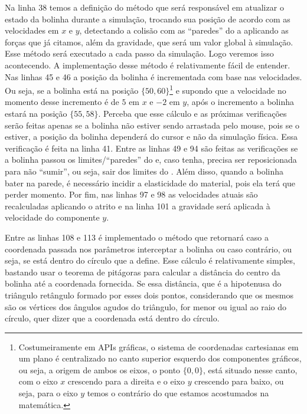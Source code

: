 Na linha 38 temos a definição do método  que será responsável em atualizar o estado da bolinha durante a simulação, trocando sua posição de acordo com as velocidades em $x$ e $y$, detectando a colisão com as ``paredes'' do  a aplicando as forças que já citamos, além da gravidade, que será um valor global à simulação. Esse método será executado a cada passo da simulação. Logo veremos isso acontecendo. A implementação desse método é relativamente fácil de entender. Nas linhas 45 e 46 a posição da bolinha é incrementada com base nas velocidades. Ou seja, se a bolinha está na posição $\{50, 60\}$\footnote{Costumeiramente em APIs gráficas, o sistema de coordenadas cartesianas em um plano é centralizado no canto superior esquerdo dos componentes gráficos, ou seja, a origem de ambos os eixos, o ponto $\{0, 0\}$, está situado nesse canto, com o eixo $x$ crescendo para a direita e o eixo $y$ crescendo para baixo, ou seja, para o eixo $y$ temos o contrário do que estamos acostumados na matemática.} e supondo que a velocidade no momento desse incremento é de $5$ em $x$ e $-2$ em $y$, após o incremento a bolinha estará na posição $\{55, 58\}$. Perceba que esse cálculo e as próximas verificações serão feitas apenas se a bolinha não estiver sendo arrastada pelo mouse, pois se o estiver, a posição da bolinha dependerá do cursor e não da simulação física. Essa verificação é feita na linha 41. Entre as linhas 49 e 94 são feitas as verificações se a bolinha passou os limites/``paredes'' do  e, caso tenha, precisa ser reposicionada para não ``sumir'', ou seja, sair dos limites do . Além disso, quando a bolinha bater na parede, é necessário incidir a elasticidade do material, pois ela terá que perder momento. Por fim, nas linhas 97 e 98 as velocidades atuais são recalculadas aplicando o atrito e na linha 101 a gravidade será aplicada à velocidade do componente $y$.

Entre as linhas 108 e 113 é implementado o método  que retornará  caso a coordenada passada nos parâmetros interceptar a bolinha ou  caso contrário, ou seja, se está dentro do círculo que a define. Esse cálculo é relativamente simples, bastando usar o teorema de pitágoras para calcular a distância do centro da bolinha até a coordenada fornecida. Se essa distância, que é a hipotenusa do triângulo retângulo formado por esses dois pontos, considerando que os mesmos são os vértices dos ângulos agudos do triângulo, for menor ou igual ao raio do círculo, quer dizer que a coordenada está dentro do círculo.

